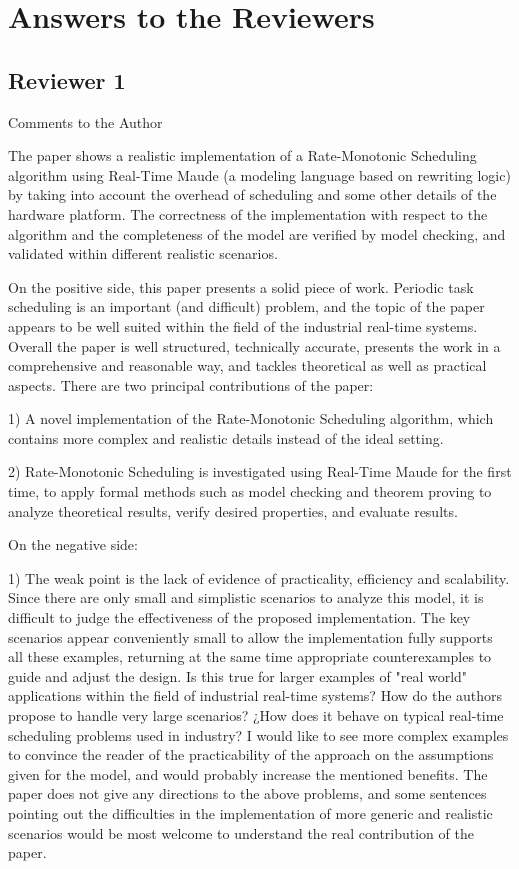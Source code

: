 \documentclass[10pt,journal]{IEEEtran}
\begin{document}
\section{Answers to the Reviewers}
\subsection{Reviewer 1}
Comments to the Author

The paper shows a realistic implementation of a Rate-Monotonic
Scheduling algorithm using Real-Time Maude (a modeling language based
on rewriting logic) by taking into account the overhead of scheduling
and some other details of the hardware platform. The correctness of
the implementation with respect to the algorithm and the completeness
of the model are verified by model checking, and validated within
different realistic scenarios.

On the positive side, this paper presents a solid piece of
work. Periodic task scheduling is an important (and difficult)
problem, and the topic of the paper appears to be well suited within
the field of the industrial real-time systems. Overall the paper is
well structured, technically accurate, presents the work in a
comprehensive and reasonable way, and tackles theoretical as well as
practical aspects. There are two principal contributions of the paper:

1) A novel implementation of the Rate-Monotonic Scheduling algorithm,
which contains more complex and realistic details instead of the ideal
setting.

2) Rate-Monotonic Scheduling is investigated using Real-Time Maude for
the first time, to apply formal methods such as model checking and
theorem proving to analyze theoretical results, verify desired
properties, and evaluate results.

On the negative side:

1) The weak point is the lack of evidence of practicality, efficiency
and scalability. Since there are only small and simplistic scenarios
to analyze this model, it is difficult to judge the effectiveness of
the proposed implementation. The key scenarios appear conveniently
small to allow the implementation fully supports all these examples,
returning at the same time appropriate counterexamples to guide and
adjust the design. Is this true for larger examples of "real world"
applications within the field of industrial real-time systems? How do
the authors propose to handle very large scenarios? ¿How does it
behave on typical real-time scheduling problems used in industry? I
would like to see more complex examples to convince the reader of the
practicability of the approach on the assumptions given for the model,
and would probably increase the mentioned benefits. The paper does not
give any directions to the above problems, and some sentences pointing
out the difficulties in the implementation of more generic and
realistic scenarios would be most welcome to understand the real
contribution of the paper.
\end{document}
